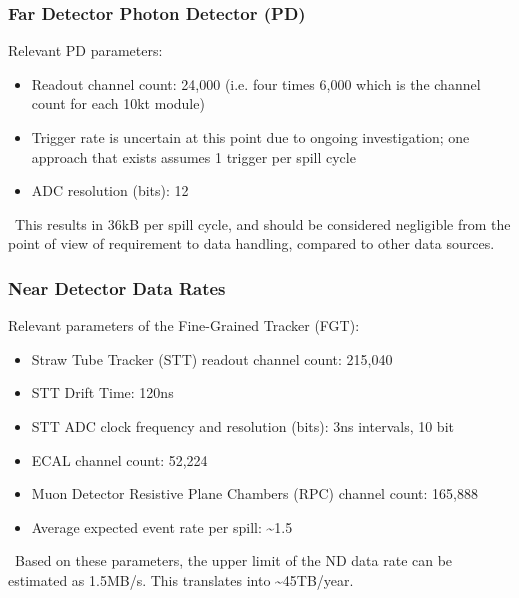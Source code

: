 

\subsubsection{Far Detector Photon Detector (PD)}
Relevant  PD parameters:
\begin{itemize}
\item Readout channel count: 24,000 (i.e. four times 6,000 which is the channel count for each 10kt module)
\item Trigger rate is uncertain at this point due to ongoing investigation; one approach that exists assumes 1 trigger per spill cycle
\item ADC resolution (bits): 12
\end{itemize}
\
This results in 36kB per spill cycle, and should be considered negligible from the point of view of requirement to data handling, compared to other data sources.

\subsubsection{Near Detector Data Rates}
Relevant parameters of the Fine-Grained Tracker (FGT):
\begin{itemize}
\item   Straw Tube Tracker (STT) readout channel count: 215,040
\item STT Drift Time: 120ns
\item STT ADC clock frequency and resolution (bits): 3ns intervals, 10 bit
\item ECAL channel count: 52,224
\item Muon Detector Resistive Plane Chambers (RPC) channel count: 165,888
\item Average expected event rate per spill: \textasciitilde 1.5
\end{itemize}
\
Based on these parameters, the upper limit of the ND data rate can be estimated as 1.5MB/s. This translates into \textasciitilde 45TB/year. 

